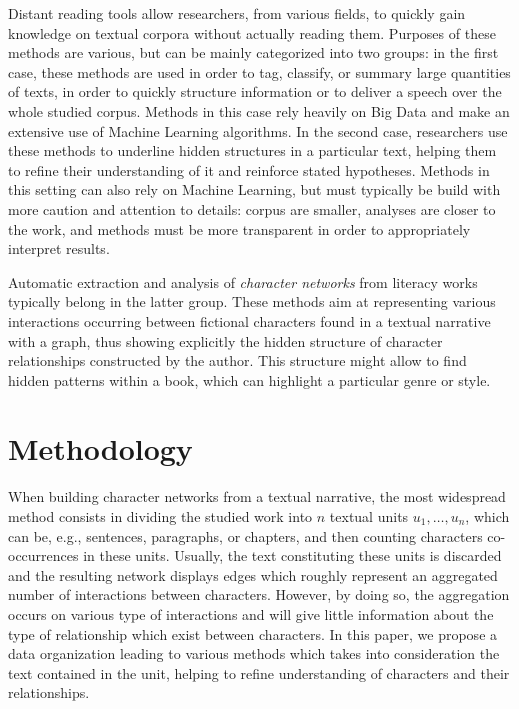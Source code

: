 \documentclass[
twocolumn,
]{ceurart}
\begin{document}
Distant reading tools allow researchers, from various fields, to quickly gain knowledge on textual corpora without actually reading them. Purposes of these methods are various, but can be mainly categorized into two groups: in the first case, these methods are used in order to tag, classify, or summary large quantities of texts, in order to quickly structure information or to deliver a speech over the whole studied corpus. Methods in this case rely heavily on Big Data and make an extensive use of Machine Learning algorithms. In the second case, researchers use these methods to underline hidden structures in a particular text, helping them to refine their understanding of it and reinforce stated hypotheses. Methods in this setting can also rely on Machine Learning, but must typically be build with more caution and attention to details: corpus are smaller, analyses are closer to the work, and methods must be more transparent in order to appropriately interpret results.

Automatic extraction and analysis of \emph{character networks} from literacy works typically belong in the latter group. These methods aim at representing various interactions occurring between fictional characters found in a textual narrative with a graph, thus showing explicitly the hidden structure of character relationships constructed by the author. This structure might allow to find hidden patterns within a book, which can highlight a particular genre or style.

\section{Methodology}


When building character networks from a textual narrative, the most widespread method consists in dividing the studied work into $n$ textual units $u_1, \ldots, u_n$, which can be, e.g., sentences, paragraphs, or chapters, and then counting characters co-occurrences in these units. Usually, the text constituting these units is discarded and the resulting network displays edges which roughly represent an aggregated number of interactions between characters. However, by doing so, the aggregation occurs on various type of interactions and will give little information about the type of relationship which exist between characters. In this paper, we propose a data organization leading to various methods which takes into consideration the text contained in the unit, helping to refine understanding of characters and their relationships.
\end{document}
